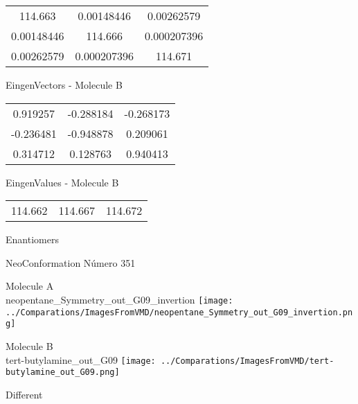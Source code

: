\begin{multicols}{2}
\begin{center}
\begin{tabular}{|c c c|}
114.663	 & 	0.00148446	 & 	0.00262579	 \\
0.00148446	 & 	114.666	 & 	0.000207396	 \\
0.00262579	 & 	0.000207396	 & 	114.671
\end{tabular}

\vtab
 EingenVectors - Molecule B     \\
\vtab
\begin{tabular}{|c c c|}
0.919257	 & 	-0.288184	 & 	-0.268173	 \\
-0.236481	 & 	-0.948878	 & 	0.209061	 \\
0.314712	 & 	0.128763	 & 	0.940413
\end{tabular}

\vtab
 EingenValues - Molecule B     \\
\vtab
\begin{tabular}{|c c c|}
114.662	 & 	114.667	 & 	114.672	 \\
\end{tabular}

\end{center}
\end{multicols}
\begin{center}
\vtab
\vtab
\textcolor{NavyBlue}{\Large Enantiomers}
\end{center}

 \newpage

\vtab[-2cm]
\begin{center}
{\large NeoConformation \tab Número 351}
\end{center}
\begin{multicols}{2}
\begin{center}
Molecule A \\ 
neopentane\_Symmetry\_out\_G09\_invertion
\texttt{[image: ../Comparations/ImagesFromVMD/neopentane\_Symmetry\_out\_G09\_invertion.png]}
\\
\vtab

\columnbreak
Molecule B \\ 
tert-butylamine\_out\_G09
\texttt{[image: ../Comparations/ImagesFromVMD/tert-butylamine\_out\_G09.png]}
\\
\vtab


\end{center}
\end{multicols}
\begin{center}
\vtab
\vtab
\textcolor{NavyBlue}{\Large Different}
\end{center}

